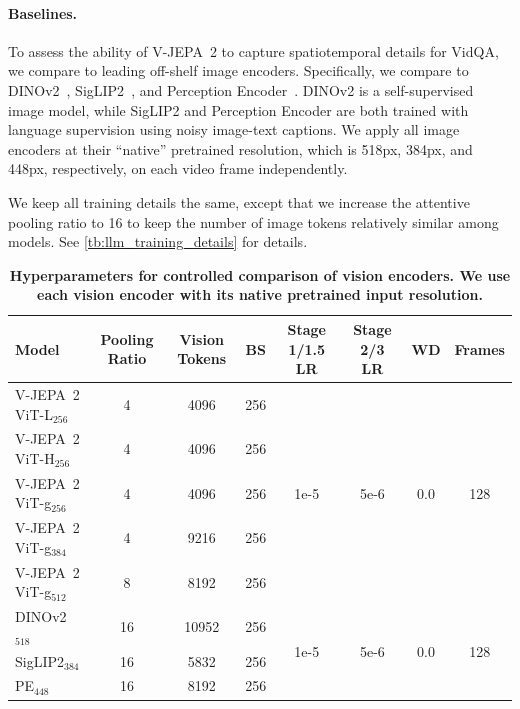 \documentclass[]{fairmeta}
\newcommand{\model}{V-JEPA~2\xspace}
\begin{document}
\paragraph{\bf Baselines.} To assess the ability of \model to capture spatiotemporal details for VidQA, we compare to leading off-shelf image encoders. Specifically, we compare to DINOv2~\citep{oquab2023dinov2}, SigLIP2~\citep{tschannen2025siglip}, and Perception Encoder~\citep{bolya_perception_encoder_2025}. DINOv2 is a self-supervised image model, while SigLIP2 and Perception Encoder are both trained with language supervision using noisy image-text captions. We apply all image encoders at their ``native'' pretrained resolution, which is 518px, 384px, and 448px, respectively, on each video frame independently.

We keep all training details the same, except that we increase the attentive pooling ratio to 16 to keep the number of image tokens relatively similar among models. See \autoref{tb:llm_training_details} for details.

\begin{table}[]
\centering
\small
\caption{\small{\bf Hyperparameters for controlled comparison of vision encoders. We use each vision encoder with its native pretrained input resolution.}}
\label{tb:llm_training_details}
\fontsize{8pt}{8pt}\selectfont
\begin{tabular}{l c c c c c c c}
\toprule
Model & Pooling Ratio & Vision Tokens & BS & Stage 1/1.5 LR & Stage 2/3 LR & WD & Frames \\
\midrule
\model ViT-L$_{256}$ & 4 & 4096 & 256 & \multirow{5}{*}{1e-5} & \multirow{5}{*}{5e-6} & \multirow{5}{*}{0.0} & \multirow{5}{*}{128} \\
\model ViT-H$_{256}$ & 4 & 4096 & 256 & & & & \\
\model ViT-g$_{256}$ & 4 & 4096 & 256 &  & & & \\
\model ViT-g$_{384}$ & 4 & 9216 & 256 & & & & \\
\model ViT-g$_{512}$ & 8 & 8192 & 256 & & & & \\
\midrule
DINOv2$_{518}$ & 16 & 10952 & 256 & \multirow{4}{*}{1e-5} & \multirow{3}{*}{5e-6} & \multirow{3}{*}{0.0} & \multirow{4}{*}{128} \\
SigLIP2$_{384}$ & 16 & 5832 & 256 & & & & \\
PE$_{448}$ & 16 & 8192 & 256 & & & & \\
\bottomrule
\end{tabular}
\end{table}
\end{document}
